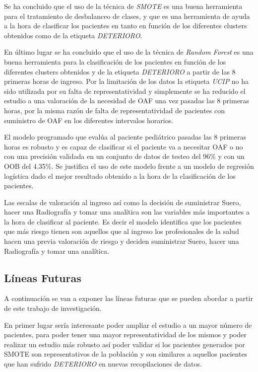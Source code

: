 Se ha concluido que el uso de la técnica de \textit{SMOTE} es una buena herramienta para el tratamiento de desbalanceo de clases, y que es una herramienta de ayuda a la hora de clasificar los pacientes en tanto en función de los diferentes clusters obtenidos como de la etiqueta \textit{DETERIORO}.

En último lugar se ha concluido que el uso de la técnica de \textit{Random Forest} es una buena herramienta para la clasificación de los pacientes en función de los diferentes clusters obtenidos y de la etiqueta \textit{DETERIORO} a partir de las 8 primeras horas de ingreso. Por la limitación de los datos la etiqueta \textit{UCIP} no ha sido utilizada por su falta de representatividad y simplemente se ha reducido el estudio a una valoración de la necesidad de OAF una vez pasadas las 8 primeras horas, por la misma razón de falta de representatividad de pacientes con suministro de OAF en los diferentes intervalos horarios.

El modelo programado que evalúa al paciente pediátrico pasadas las 8 primeras horas es robusto y es capaz de clasificar si el paciente va a necesitar OAF o no con una precisión validada en un conjunto de datos de testeo del 96\% y con un OOB del 4.35\%. Se justifica el uso de este modelo frente a un modelo de regresión logística dado el mejor resultado obtenido a la hora de la clasificación de los pacientes.

Las escalas de valoración al ingreso así como la decisión de suministrar Suero, hacer una Radiografía y tomar una analítica son las variables más importantes a la hora de clasificar al paciente. Es decir el modelo identifica que los pacientes que más riesgo tienen son aquellos que al ingreso los profesionales de la salud hacen una previa valoración de riesgo y deciden suministrar Suero, hacer una Radiografía y tomar una analítica.



\subsection{Líneas Futuras}\label{sec:líneas-futuras}

A continuación se van a exponer las líneas futuras que se pueden abordar a partir de este trabajo de investigación.

En primer lugar sería interesante poder ampliar el estudio a un mayor número de pacientes, para poder tener una mayor representatividad de los mismos y poder realizar un estudio más robusto así poder validar si los pacientes generados por SMOTE son representativos de la población y son similares a aquellos pacientes que han sufrido \textit{DETERIORO} en nuevas recopilaciones de datos.

